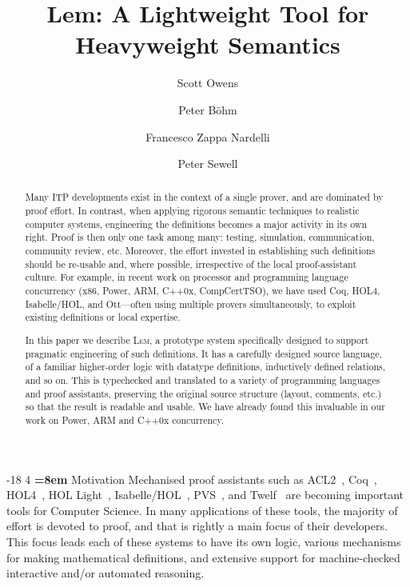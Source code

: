 \documentclass[a4paper]{llncs}
\author{Scott Owens\inst{1} \and Peter B\"ohm\inst{1} \and Francesco Zappa Nardelli\inst{2} \and Peter Sewell\inst{1}}
\title{Lem: A Lightweight Tool for Heavyweight Semantics}
\institute{University of Cambridge \and INRIA\\ \url{www.cl.cam.ac.uk/users/so294/lem}\vspace*{-3mm}}
\makeatletter
\renewcommand{\section}{\vspace*{-2mm}\@startsection{section}{1}{\z@}%
                       {-18\p@ \@plus -4\p@ \@minus -4\p@}%
                       {4\p@ \@plus 2\p@ \@minus 2\p@}%
                       {\normalfont\large\bfseries\boldmath
                        \rightskip=\z@ \@plus 8em\pretolerance=10000 }}
\newcommand{\toolname}{\textsc{Lem}}
\makeatother
\begin{document}
\sloppy
\maketitle
\vspace*{-3mm}
\begin{abstract}
Many ITP developments exist in the context of a single prover, and are
dominated by proof effort.  In contrast, when applying rigorous semantic
techniques to realistic computer systems, engineering the
definitions becomes a major activity in its own right.  Proof is then
only one task among many: testing, simulation, communication, community
review, etc.  Moreover, the effort invested in establishing such
definitions should be re-usable and, where possible, irrespective of the
local proof-assistant culture.  For example, in recent work on processor
and programming language concurrency (x86, Power, ARM, C++0x,
CompCertTSO), we have used Coq, HOL4, Isabelle/HOL, and Ott---often
using multiple provers simultaneously, to exploit existing definitions or
local expertise.   

In this paper we describe \toolname{}, a prototype system specifically designed to
support pragmatic engineering of such definitions.  It has a carefully
designed source language, of a familiar higher-order logic with datatype
definitions, inductively defined relations, and so on.  This is
typechecked and translated to a variety
of programming languages and proof assistants, preserving the
original source structure (layout,  comments, etc.) so that the result
is readable and usable.  We have already found this invaluable in our
work on Power, ARM and C++0x concurrency.
\end{abstract}

\vspace*{-7mm}

\section{Motivation}
Mechanised proof assistants 
such as ACL2~\cite{ACL2}, Coq~\cite{Coq}, HOL4~\cite{HOL}, HOL
Light~\cite{HOLlight}, Isabelle/HOL~\cite{Isabelle}, PVS~\cite{PVS}, and
Twelf~\cite{Twelf} are becoming important tools for Computer Science.
In many applications of these tools, the majority of effort is devoted
to proof, and that is rightly a main focus of their developers.  This
focus leads each of these systems to have its own logic, various mechanisms for
making mathematical definitions, and extensive support for machine-checked interactive and/or automated
reasoning.
\end{document}
